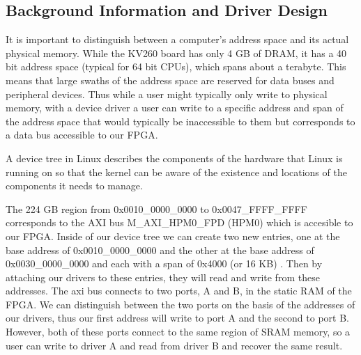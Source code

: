 \documentclass[psamsfonts]{amsart}
\theoremstyle{definition}
\theoremstyle{remark}
\numberwithin{equation}{section}
\begin{document}
\subsection{Background Information and Driver Design}
It is important to distinguish between a computer's address space and its actual physical memory. While the KV260 board has only 4 GB of DRAM, it has a 40 bit address space (typical for 64 bit CPUs), which spans about a terabyte. This means that large swaths of the address space are reserved for data buses and peripheral devices. Thus while a user might typically only write to physical memory, with a device driver a user can write to a specific address and span of the address space that would typically be inaccessible to them but corresponds to a data bus accessible to our FPGA.

A device tree in Linux describes the components of the hardware that Linux is running on so that the kernel can be aware of the existence and locations of the components it needs to manage.

The 224 GB region from 0x0010\_0000\_0000 to 0x0047\_FFFF\_FFFF corresponds to the AXI bus M\_AXI\_HPM0\_FPD (HPM0) which is accesible to our FPGA. Inside of our device tree we can create two new entries, one at the base address of 0x0010\_0000\_0000 and the other at the base address of 0x0030\_0000\_0000 and each with a span of 0x4000 (or 16 KB) \cite{zynq-doc}. Then by attaching our drivers to these entries, they will read and write from these addresses. The axi bus connects to two ports, A and B, in the static RAM of the FPGA. We can distinguish between the two ports on the basis of the addresses of our drivers, thus our first address will write to port A and the second to port B. However, both of these ports connect to the same region of SRAM memory, so a user can write to driver A and read from driver B and recover the same result.
\end{document}
